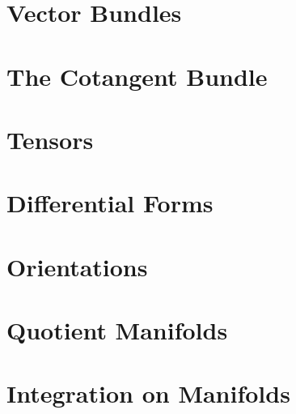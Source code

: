 \documentclass[12pt, a4paper, oneside, openright, titlepage]{book}
\begin{document}
\chapter{ Vector Bundles}


\chapter{ The Cotangent Bundle}


\chapter{ Tensors}


\chapter{ Differential Forms}


\chapter{ Orientations}


\chapter{ Quotient Manifolds}


\chapter{ Integration on Manifolds}
\end{document}
